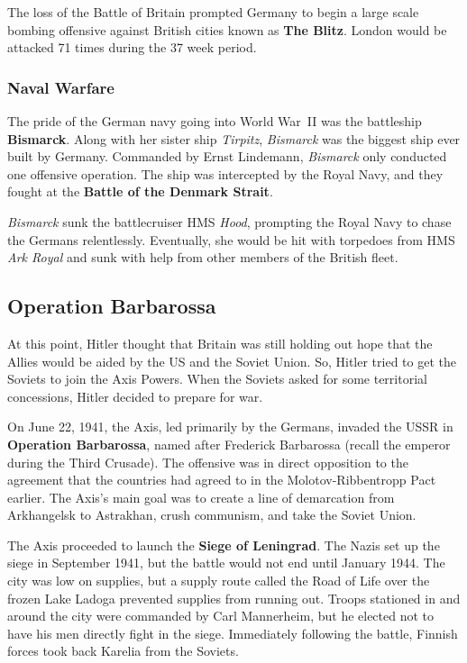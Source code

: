 The loss of the Battle of Britain prompted Germany to begin a large scale bombing offensive against British cities
known as \textbf{The Blitz}.
London would be attacked 71 times during the 37 week period.

\subsubsection*{Naval Warfare}

The pride of the German navy going into World War~II was the battleship \textbf{Bismarck}.
Along with her sister ship \textit{Tirpitz}, \textit{Bismarck} was the biggest ship ever built by Germany.
Commanded by Ernst Lindemann, \textit{Bismarck} only conducted one offensive operation.
The ship was intercepted by the Royal Navy, and they fought at the \textbf{Battle of the Denmark Strait}.

\textit{Bismarck} sunk the battlecruiser HMS \textit{Hood},
prompting the Royal Navy to chase the Germans relentlessly.
Eventually, she would be hit with torpedoes from HMS \textit{Ark Royal}
and sunk with help from other members of the British fleet.

\subsection*{Operation Barbarossa}

At this point, Hitler thought that Britain was still holding out hope
that the Allies would be aided by the US and the Soviet Union.
So, Hitler tried to get the Soviets to join the Axis Powers.
When the Soviets asked for some territorial concessions, Hitler decided to prepare for war.

On June 22, 1941, the Axis, led primarily by the Germans, invaded the USSR in \textbf{Operation Barbarossa},
named after Frederick Barbarossa (recall the emperor during the Third Crusade).
The offensive was in direct opposition to the agreement
that the countries had agreed to in the Molotov-Ribbentropp Pact earlier.
The Axis's main goal was to create a line of demarcation from Arkhangelsk to Astrakhan,
crush communism, and take the Soviet Union.

The Axis proceeded to launch the \textbf{Siege of Leningrad}.
The Nazis set up the siege in September 1941, but the battle would not end until January 1944.
The city was low on supplies, but a supply route called the Road of Life over the frozen Lake Ladoga
prevented supplies from running out.
Troops stationed in and around the city were commanded by Carl Mannerheim,
but he elected not to have his men directly fight in the siege.
Immediately following the battle, Finnish forces took back Karelia from the Soviets.

